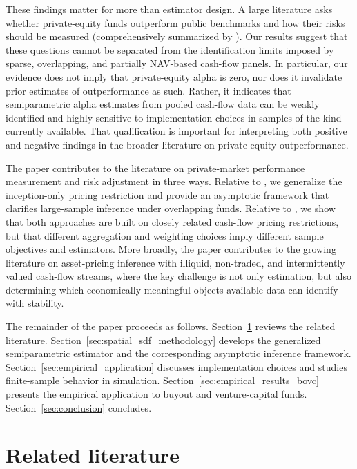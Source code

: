 These findings matter for more than estimator design. 
A large literature asks whether private-equity funds outperform public benchmarks and how their risks should be measured (comprehensively summarized by \cite{K19,korteweg2023risk}). 
Our results suggest that these questions cannot be separated from the identification limits imposed by sparse, overlapping, and partially NAV-based cash-flow panels. 
In particular, our evidence does not imply that private-equity alpha is zero, nor does it invalidate prior estimates of outperformance as such. 
Rather, it indicates that semiparametric alpha estimates from pooled cash-flow data can be weakly identified and highly sensitive to implementation choices in samples of the kind currently available. 
That qualification is important for interpreting both positive and negative findings in the broader literature on private-equity outperformance.

The paper contributes to the literature on private-market performance measurement and risk adjustment in three ways. 
Relative to \citet{DLP12}, we generalize the inception-only pricing restriction and provide an asymptotic framework that clarifies large-sample inference under overlapping funds. 
Relative to \citet{KN16}, we show that both approaches are built on closely related cash-flow pricing restrictions, but that different aggregation and weighting choices imply different sample objectives and estimators.
More broadly, the paper contributes to the growing literature on asset-pricing inference with illiquid, non-traded, and intermittently valued cash-flow streams, where the key challenge is not only estimation, but also determining which economically meaningful objects available data can identify with stability.

The remainder of the paper proceeds as follows. 
Section~\ref{sec:literature} reviews the related literature. Section~\ref{sec:spatial_sdf_methodology} develops the generalized semiparametric estimator and the corresponding asymptotic inference framework. 
Section~\ref{sec:empirical_application} discusses implementation choices and studies finite-sample behavior in simulation.
Section~\ref{sec:empirical_results_bovc} presents the empirical application to buyout and venture-capital funds. 
Section~\ref{sec:conclusion} concludes.



\section{Related literature}
\label{sec:literature}

